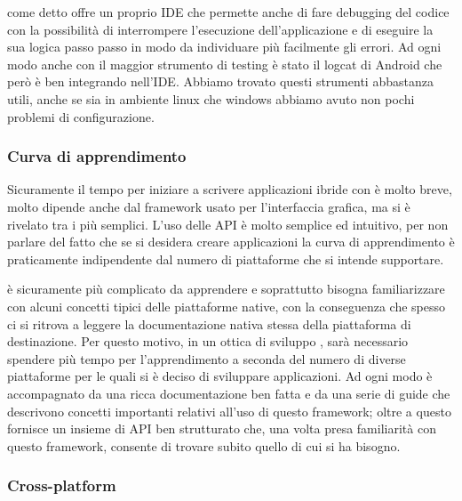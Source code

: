 		\tisdk{} come detto offre un proprio IDE che permette anche di fare 
		debugging del codice \js{} con la possibilità di interrompere 
		l'esecuzione dell'applicazione e di eseguire la sua logica passo passo 
		in modo da individuare più facilmente gli errori. Ad ogni modo anche 
		con \tisdk{} il maggior strumento di testing è stato il logcat di 
		Android che però è ben integrando nell'IDE. Abbiamo trovato 
		questi strumenti abbastanza utili, anche se sia in ambiente linux che 
		windows abbiamo avuto non pochi problemi di configurazione.  
		\subsubsection{Curva di apprendimento}
		Sicuramente il tempo per iniziare a scrivere applicazioni ibride con 
		\pg{} è molto breve, molto dipende anche dal framework usato per 
		l'interfaccia grafica, ma \kendomob{} si è rivelato tra i più semplici.
		L'uso delle API è molto semplice ed intuitivo, per non parlare del 
		fatto che se si desidera creare applicazioni \crossplat{} la curva di 
		apprendimento è praticamente indipendente dal numero di piattaforme 
		che si intende supportare.
		
		\tisdk{} è sicuramente più complicato da apprendere e soprattutto 
		bisogna familiarizzare con alcuni concetti tipici delle piattaforme 
		native, con la conseguenza che spesso ci si ritrova a leggere la 
		documentazione nativa stessa della piattaforma di destinazione. Per
        questo motivo, in un ottica di sviluppo \crossplat{}, sarà necessario
        spendere più tempo per l'apprendimento a seconda del numero di diverse
        piattaforme per le quali si è deciso di sviluppare applicazioni. Ad
        ogni modo \tisdk{} è accompagnato da una ricca documentazione ben
        fatta e da una serie di guide che descrivono concetti
        importanti relativi all'uso di questo framework; oltre a questo
        \tisdk{} fornisce un insieme di API ben strutturato che, una volta
        presa familiarità con questo framework, consente di trovare subito
        quello di cui si ha bisogno.
		\subsubsection{Cross-platform}

